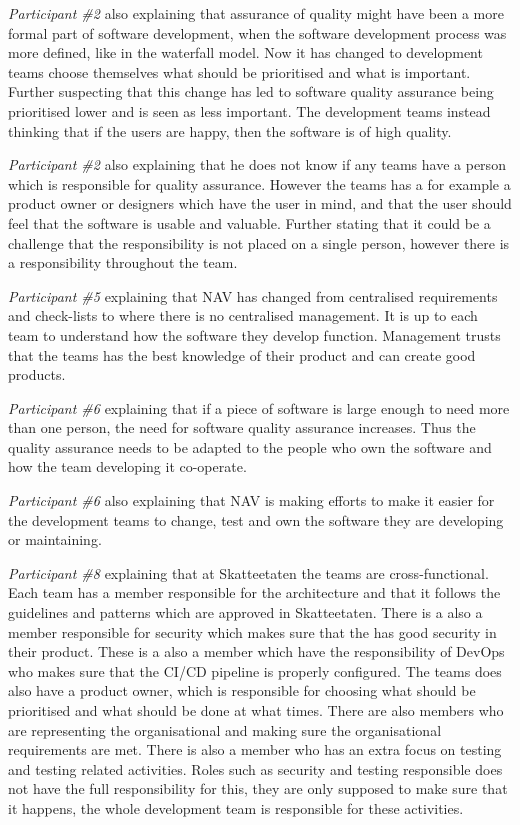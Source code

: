 \textit{Participant \#2} also explaining that assurance of quality might have been a more formal part of software development, when the software development process was more defined, like in the waterfall model. Now it has changed to development teams choose themselves what should be prioritised and what is important. Further suspecting that this change has led to software quality assurance being prioritised lower and is seen as less important. The development teams instead thinking that if the users are happy, then the software is of high quality.

\textit{Participant \#2} also explaining that he does not know if any teams have a person which is responsible for quality assurance. However the teams has a for example a product owner or designers which have the user in mind, and that the user should feel that the software is usable and valuable. Further stating that it could be a challenge that the responsibility is not placed on a single person, however there is a responsibility throughout the team.

\textit{Participant \#5} explaining that NAV has changed from centralised requirements and check-lists to where there is no centralised management. It is up to each team to understand how the software they develop function. Management trusts that the teams has the best knowledge of their product and can create good products.

\textit{Participant \#6} explaining that if a piece of software is large enough to need more than one person, the need for software quality assurance increases. Thus the quality assurance needs to be adapted to the people who own the software and how the team developing it co-operate. 

\textit{Participant \#6} also explaining that NAV is making efforts to make it easier for the development teams to change, test and own the software they are developing or maintaining.

\textit{Participant \#8} explaining that at Skatteetaten the teams are cross-functional. Each team has a member responsible for the architecture and that it follows the guidelines and patterns which are approved in Skatteetaten. There is a also a member responsible for security which makes sure that the has good security in their product. These is a also a member which have the responsibility of DevOps who makes sure that the CI/CD pipeline is properly configured. The teams does also have a product owner, which is responsible for choosing what should be prioritised and what should be done at what times. There are also members who are representing the organisational and making sure the organisational requirements are met. There is also a member who has an extra focus on testing and testing related activities. Roles such as security and testing responsible does not have the full responsibility for this, they are only supposed to make sure that it happens, the whole development team is responsible for these activities. 

